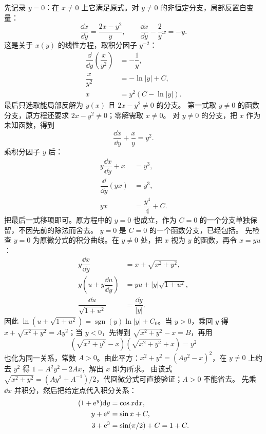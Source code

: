 先记录 $y=0$：在 $x\ne0$ 上它满足原式。对 $y\ne0$ 的非恒定分支，局部反置自变量：
\[
\dfrac{\dd x}{\dd y}=\dfrac{2x-y^2}{y},\qquad
\dfrac{\dd x}{\dd y}-\dfrac2y x=-y.
\]
这是关于 $x(y)$ 的线性方程，取积分因子 $y^{-2}$：
\[
\begin{aligned}
\dfrac\dd{\dd y}\left(\dfrac x{y^2}\right)&=-\dfrac1y,\\
\dfrac x{y^2}&=-\ln|y|+C,\\
x&=y^2(C-\ln|y|).
\end{aligned}
\]
最后只选取能局部反解为 $y(x)$ 且 $2x-y^2\ne0$ 的分支。
第一式取 $y\ne0$ 的函数分支，原方程还要求 $2x-y^2\ne0$；零解需取 $x\ne0$。
对 $y\ne0$ 的分支，把 $x$ 作为未知函数，得到
\[
\dfrac{\dd x}{\dd y}+\dfrac xy=y^2.
\]
乘积分因子 $y$ 后：
\[
\begin{aligned}
y\dfrac{\dd x}{\dd y}+x&=y^3,\\
\dfrac\dd{\dd y}(yx)&=y^3,\\
yx&=\dfrac{y^4}{4}+C.
\end{aligned}
\]
把最后一式移项即可。原方程中的 $y=0$ 也成立，作为 $C=0$ 的一个分支单独保留，不因先前的除法而舍去。
$y=0$ 是 $C=0$ 的一个函数分支，已经包括。
先检查 $y=0$ 为原微分式的积分曲线。在 $y\ne0$ 处，把 $x$ 视为 $y$ 的函数，再令 $x=yu$：
\[
\begin{aligned}
y\dfrac{\dd x}{\dd y}&=x+\sqrt{x^2+y^2},\\
y\left(u+y\dfrac{\dd u}{\dd y}\right)&=yu+|y|\sqrt{1+u^2},\\
\dfrac{\dd u}{\sqrt{1+u^2}}&=\dfrac{\dd y}{|y|}.
\end{aligned}
\]
因此 $\ln(u+\sqrt{1+u^2})=\operatorname{sgn}(y)\ln|y|+C_0$。当 $y>0$，乘回 $y$ 得 $x+\sqrt{x^2+y^2}=Ay^2$；当 $y<0$，先得到 $\sqrt{x^2+y^2}-x=B$，再用
\[
(\sqrt{x^2+y^2}-x)(\sqrt{x^2+y^2}+x)=y^2
\]
也化为同一关系，常数 $A>0$。由此平方：$x^2+y^2=(Ay^2-x)^2$，在 $y\ne0$ 上约去 $y^2$ 得 $1=A^2y^2-2Ax$，解出 $x$ 即为所求。
由该式 $\sqrt{x^2+y^2}=(Ay^2+A^{-1})/2$，代回微分式可直接验证；$A>0$ 不能省去。
先乘 $\dd x$ 并积分，然后把给定点代入积分关系：
\[
\begin{aligned}
(1+\mathrm e^y)\mathrm d y&=\cos x\mathrm d x,\\
y+\mathrm e^y&=\sin x+C,\\
3+\mathrm e^3&=\sin(\pi/2)+C=1+C.
\end{aligned}
\]
